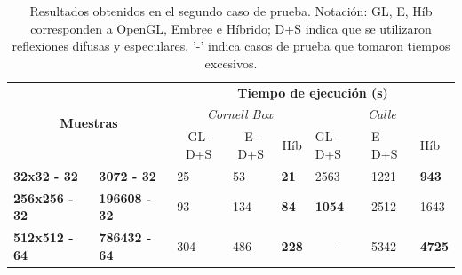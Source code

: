\begin{table}[htbp]
	\centering
	\begin{tabular}{|l|l|l|l|l||l|l|l|}
		\hline
		\multicolumn{2}{|c|}{\multirow{3}{*}{\textbf{Muestras}}} & \multicolumn{6}{c|}{\textbf{Tiempo de ejecución (s)}}                                                                                  \\ \cline{3-8} 
		\multicolumn{2}{|c|}{}                   & \multicolumn{3}{c||}{\textit{Cornell Box}}                 & \multicolumn{3}{c|}{\textit{Calle}}                      \\ \cline{3-8}
		\multicolumn{2}{|c|}{}                          & \multicolumn{1}{c|}{GL-D+S} & \multicolumn{1}{c|}{E-D+S} & \multicolumn{1}{c||}{Híb} & GL-D+S                 & E-D+S & Híb \\ \hline
		\textbf{32x32 - 32}                                &
		\textbf{3072 - 32}                                & 25                         & 53                          & \textbf{21}                           & 2563                   & 1221   & \textbf{943}     \\ \hline
		\textbf{256x256 - 32}                                &
		\textbf{196608 - 32}                               & 93                         & 134                         & \textbf{84}                          & \textbf{1054}                   & 2512   & 1643    \\ \hline
		\textbf{512x512 - 64} &\textbf{786432 - 64}                              & 304                        & 486                         & \textbf{228}                          & \multicolumn{1}{c|}{-} & 5342   & \textbf{4725}    \\ \hline
	\end{tabular}
	\caption{Resultados obtenidos en el segundo caso de prueba. Notación: GL, E, Híb corresponden a OpenGL, Embree e Híbrido; D+S indica que se utilizaron reflexiones difusas y especulares. '-' indica casos de prueba que tomaron tiempos excesivos.}
	\label{tab:caso2}
\end{table}


